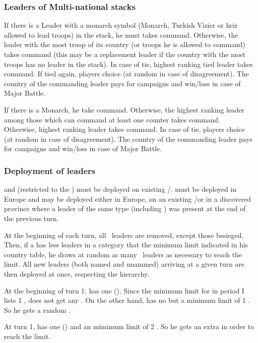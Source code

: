 \subsubsection{Leaders of Multi-national stacks}\label{chMilitary:multi national} 
\aparag[On land]
\bparag If there is a Leader with a monarch symbol (Monarch, Turkish Vizier or
heir allowed to lead troops) in the stack, he must takes command.
\bparag Otherwise, the leader with the most troop of its country (or troops he
is allowed to command) takes command (this may be a replacement leader if the
country with the most troops has no leader in the stack).
\bparag In case of tie, highest ranking tied leader takes command.
\bparag If tied again, players choice (at random in case of disagreement).
\bparag The country of the commanding leader pays for campaigns and win/loss
\STAB in case of Major Battle.

\aparag[At sea]
\bparag If there is a Monarch, he take command.
\bparag Otherwise, the highest ranking leader among those which can command at
least one \FLEET counter takes command.
\bparag Otherwise, highest ranking leader takes command.
\bparag In case of tie, players choice (at random in case of disagreement).
\bparag The country of the commanding leader pays for campaigns and win/loss
\STAB in case of Major Battle.

\subsubsection{Deployment of leaders}%


\bparag \LeaderGov and \LeaderG (restricted to the \ROTW) must be deployed on
existing \COL/\TP.
\bparag \LeaderMis must be deployed in Europe
\bparag \LeaderE and \LeaderC may be deployed either in Europe, on an existing
\COL/\TP or in a discovered province where a leader of the same type
(including \anonyme) was present at the end of the previous turn.

\bparag At the beginning of each turn, all \MAJ \anonyme\ leaders are removed,
except those besieged.
\bparag Then, if a \MAJ has less leaders in a category that the minimum limit
indicated in his country table, he draws at random as many \anonyme\ leaders as
necessary to reach the limit.
\bparag All new leaders (both named and unammed) arriving at a given turn are
then deployed at once, respecting the hierarchy.
\begin{exemple}
  At the beginning of turn 1, \POR has one \LeaderE (). Since the
  minimum limit for \POR in period I lists 1 \LeaderE, \POR does not get any
  \anonyme\LeaderE. On the other hand, \POR has no \LeaderC but a minimum
  limit of 1 \LeaderC. So he gets a random \anonyme\LeaderC. 

  At turn 1, \FRA has one \LeaderG () and an mimimum limit of 2
  \LeaderG. So he gets an extra \anonyme\LeaderG in order to reach the limit.
\end{exemple}

